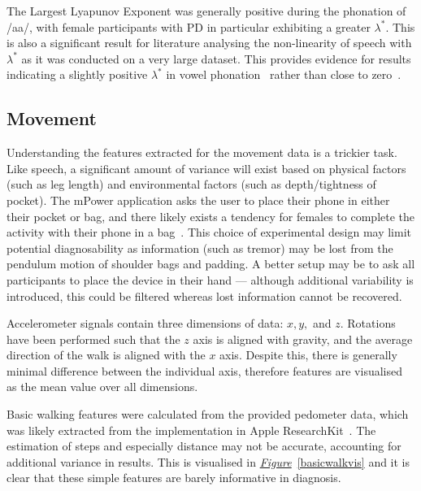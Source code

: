 \documentclass[12pt, twoside]{book}
\begin{document}
The Largest Lyapunov Exponent was generally positive during the phonation of /aa/, with female participants with PD in particular exhibiting a greater $\lambda^*$. This is also a significant result for literature analysing the non-linearity of speech with $\lambda^*$ as it was conducted on a very large dataset. This provides evidence for results indicating a slightly positive $\lambda^*$ in vowel phonation~\cite{kokkinos2005nonlinearlyapunov, lyapunovpositive} rather than close to zero~\cite{banbrook1999speechlyapunov, lyapunovzero}.

\subsection{Movement}
Understanding the features extracted for the movement data is a trickier task. Like speech, a significant amount of variance will exist based on physical factors (such as leg length) and environmental factors (such as depth/tightness of pocket). The mPower application asks the user to place their phone in either their pocket or bag, and there likely exists a tendency for females to complete the activity with their phone in a bag~\cite{femalephone}. This choice of experimental design may limit potential diagnosability as information (such as tremor) may be lost from the pendulum motion of shoulder bags and padding. A better setup may be to ask all participants to place the device in their hand --- although additional variability is introduced, this could be filtered whereas lost information cannot be recovered.

Accelerometer signals contain three dimensions of data: $x, y,$ and $z$. Rotations have been performed such that the $z$ axis is aligned with gravity, and the average direction of the walk is aligned with the $x$ axis. Despite this, there is generally minimal difference between the individual axis, therefore features are visualised as the mean value over all dimensions.

Basic walking features were calculated from the provided pedometer data, which was likely extracted from the implementation in Apple ResearchKit~\cite{mpower}. The estimation of steps and especially distance may not be accurate, accounting for additional variance in results. This is visualised in \textit{\hyperref[basicwalkvis]{Figure}}~\ref{basicwalkvis} and it is clear that these simple features are barely informative in diagnosis.
\end{document}
